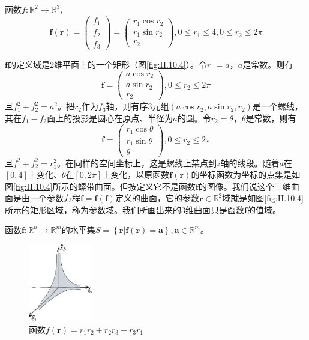\documentclass[main.tex]{subfiles}
\begin{document}
\begin{example}
函数$f:\mathbb{R}^2\rightarrow\mathbb{R}^3,$
\[
\mathbf{f}\left(\mathbf{r}\right)=\left(\begin{array}{c}f_1\\f_2\\f_3\end{array}\right)=\left(\begin{array}{c}r_1\cos r_2\\r_1\sin r_2\\r_2\end{array}\right),0\leq r_1\leq 4,0\leq r_2\leq 2\pi
\]

$\mathbf{f}$的定义域是2维平面上的一个矩形（图\ref{fig:II.10.4}）。令$r_1=a$，$a$是常数。则有
\[
\mathbf{f}=\left(\begin{array}{c}
    a\cos r_2\\
    a\sin r_2\\
    r_2
    \end{array}\right),0\leq r_2\leq 2\pi
\]
且$f_1^2+f_2^2=a^2$。把$r_2$作为$f_3$轴，则有序3元组$\left(a\cos r_2,a\sin r_2,r_2\right)$是一个螺线，其在$f_1-f_2$面上的投影是圆心在原点、半径为$a$的圆。令$r_2=\theta$，$\theta$是常数，则有
\[
\mathbf{f}=\left(\begin{array}{c}
    r_1\cos \theta\\
    r_1\sin \theta\\
    \theta
    \end{array}\right),0\leq r_2\leq 2\pi
\]
且$f_1^2+f_2^2=r_1^2$。在同样的空间坐标上，这是螺线上某点到$z$轴的线段。随着$a$在$\left[0,4\right]$上变化、$\theta$在$\left[0,2\pi\right]$上变化，以原函数$\mathbf{f}\left(\mathbf{r}\right)$的坐标函数为坐标的点集是如图\ref{fig:II.10.4}所示的螺带曲面。但按定义它不是函数$\mathbf{f}$的图像。我们说这个三维曲面是由一个参数方程$\mathbf{f}=\mathbf{f}\left(\mathbf{f}\right)$定义的曲面，它的参数$\mathbf{r}\in\mathbb{R}^2$域就是如图\ref{fig:II.10.4}所示的矩形区域，称为参数域。我们所画出来的3维曲面只是函数$\mathbf{f}$的值域。
\end{example}

\begin{definition}[函数的水平集]
函数$\mathbf{f}:\mathbb{R}^n\rightarrow\mathbb{R}^m$的水平集$S=\left\{\mathbf{r}|\mathbf{f}\left(\mathbf{r}\right)=\mathbf{a}\right\},\mathbf{a}\in\mathbb{R}^m$。
\end{definition}

\begin{figure}[h]
    \centering
    \includegraphics[width=0.25\textwidth]{images/II.10.5.eps}
    \caption{函数$f\left(\mathbf{r}\right)=r_1r_2+r_2r_3+r_3r_1$}
    \label{fig:II.10.5}
\end{figure}
\end{document}
